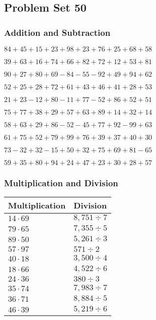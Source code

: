 \hypertarget{problem-set-50}{%
\subsection{Problem Set 50}\label{problem-set-50}}

\hypertarget{addition-and-subtraction}{%
\subsubsection{Addition and
Subtraction}\label{addition-and-subtraction}}

\(84+45+15+23+98+23+76+25+68+58\)

\(39+63+16+74+66+82+72+12+53+81\)

\(90+27+80+69-84-55-92+49+94+62\)

\(52+25+28+72+61+43+46+41+28+53\)

\(21+23-12+80-11+77-52+86+52+51\)

\(75+77+38+29+57+63+89+14+32+14\)

\(58+63+29+86-52-45+77+92-99+63\)

\(61+75+52+79+99+76+39+37+40+30\)

\(73-32+32-15+50+32+75+69+81-65\)

\(59+35+80+94+24+47+23+30+28+57\)

\hypertarget{multiplication-and-division}{%
\subsubsection{Multiplication and
Division}\label{multiplication-and-division}}

\begin{longtable}[]{@{}ll@{}}
\toprule
Multiplication & Division\tabularnewline
\midrule
\endhead
\(14\cdot69\) & \(8,751÷7\)\tabularnewline
\(79\cdot65\) & \(7,355÷5\)\tabularnewline
\(89\cdot50\) & \(5,261÷3\)\tabularnewline
\(57\cdot97\) & \(571÷2\)\tabularnewline
\(40\cdot18\) & \(3,500÷4\)\tabularnewline
\(18\cdot66\) & \(4,522÷6\)\tabularnewline
\(24\cdot36\) & \(380÷3\)\tabularnewline
\(35\cdot74\) & \(7,983÷7\)\tabularnewline
\(36\cdot71\) & \(8,884÷5\)\tabularnewline
\(46\cdot39\) & \(5,219 ÷6\)\tabularnewline
\bottomrule
\end{longtable}

